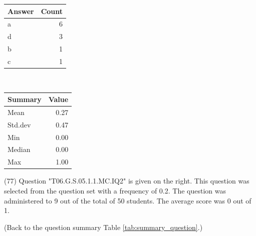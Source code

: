\documentclass[12pt,english,nohyper]{tufte-handout}\usepackage[]{graphicx}\usepackage[]{color}
\begin{document}
\begin{center}%
\begin{tabular}{lr}
  \hline
Answer & Count \\ 
  \hline
a &   6 \\ 
  d &   3 \\ 
  b &   1 \\ 
  c &   1 \\ 
   \hline
\end{tabular}
~~~~~~~~%
\begin{tabular}{lr}
  \hline
Summary & Value \\ 
  \hline
Mean & 0.27 \\ 
  Std.dev & 0.47 \\ 
  Min & 0.00 \\ 
  Median & 0.00 \\ 
  Max & 1.00 \\ 
   \hline
\end{tabular}
\end{center}\newpage{} (77) Question "T06.G.S.05.1.1.MC.IQ2" is given on the right. This question was selected from the question set with a frequency of 0.2. The question was administered to 9 out of the total of 50 students. The average score was 0 out of 1.

 (Back to the question summary Table \ref{tab:summary_question}.)
\end{document}
